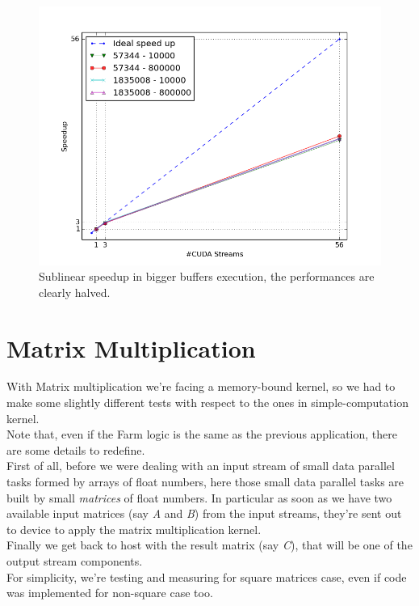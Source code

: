 	\begin{figure}
		\vspace{-2cm}
		\centering
		\includegraphics[scale=0.7]{plots/cos_speedup_biggerbuffer.png}
		\caption{Sublinear speedup in bigger buffers execution, the performances are clearly halved.}
		\label{fig:biggerbufferspeedup}
		
	\end{figure}








\section{Matrix Multiplication}
With Matrix multiplication we're facing a memory-bound kernel, so we had to make some slightly different tests with respect to the ones in simple-computation kernel.\\
Note that, even if the Farm logic is the same as the previous application, there are some details to redefine.\\
First of all, before we were dealing with an input stream of small data parallel tasks formed by arrays of float numbers, here those small data parallel tasks are built by small \textit{matrices} of float numbers. In particular as soon as we have two available input matrices (say \textit{A} and \textit{B}) from the input streams, they're sent out to device to apply the matrix multiplication kernel.\\
Finally we get back to host with the result matrix (say \textit{C}), that will be one of the output stream components.\\
For simplicity, we're testing and measuring for square matrices case, even if code was implemented for non-square case too. 

